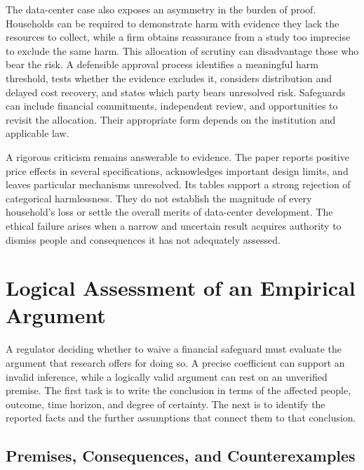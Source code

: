 The data-center case also exposes an asymmetry in the burden of proof.
Households can be required to demonstrate harm with evidence they lack
the resources to collect, while a firm obtains reassurance from a study
too imprecise to exclude the same harm. This allocation of scrutiny can
disadvantage those who bear the risk. A defensible approval process
identifies a meaningful harm threshold, tests whether the evidence
excludes it, considers distribution and delayed cost recovery, and
states which party bears unresolved risk. Safeguards can include
financial commitments, independent review, and opportunities to revisit
the allocation. Their appropriate form depends on the institution and
applicable law.

A rigorous criticism remains answerable to evidence. The paper reports
positive price effects in several specifications, acknowledges important
design limits, and leaves particular mechanisms unresolved. Its tables
support a strong rejection of categorical harmlessness. They do not
establish the magnitude of every household's loss or settle the overall
merits of data-center development. The ethical failure arises when a
narrow and uncertain result acquires authority to dismiss people and
consequences it has not adequately assessed.


\hypertarget{M09-logical-assessment-of-an-empirical-argument}{%
\section{Logical Assessment of an Empirical
Argument}\label{M09-logical-assessment-of-an-empirical-argument}}

\noindent \noindent A regulator deciding whether to waive a financial safeguard
must evaluate the argument that research offers for doing so. A precise
coefficient can support an invalid inference, while a logically valid
argument can rest on an unverified premise. The first task is to write
the conclusion in terms of the affected people, outcome, time horizon,
and degree of certainty. The next is to identify the reported facts and
the further assumptions that connect them to that conclusion.

\hypertarget{M09-premises-consequences-and-counterexamples}{%
\subsection{Premises, Consequences, and
Counterexamples}\label{M09-premises-consequences-and-counterexamples}}

